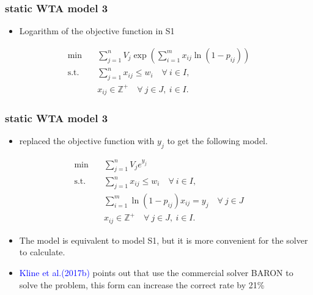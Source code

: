 \documentclass[CJK,10pt]{beamer}
\begin{document}
\begin{frame}
    \frametitle{static WTA model 3}
    \begin{itemize}
        \item Logarithm of the objective function in S1
    \end{itemize}
    \begin{align*} \tag{S3.1}
        \min\quad & \sum_{j=1}^n V_j \exp \left( \sum_{i=1}^m {x_{ij}\ln(1 -  p_{ij})} \right) \\ 
        \mathrm{s. t.}\quad &\sum_{j=1}^n x_{ij} \leq w_i\quad \forall ~i \in I,\\
        & x_{ij} \in \mathbb{Z}^+ \quad \forall~ j\in J , ~ i \in I.
    \end{align*}
\end{frame}

\begin{frame}
    \frametitle{static WTA model 3}
    \begin{itemize}
        \item replaced the objective function with $y_j$ to get the following model.
    \end{itemize}
    \begin{align*} \tag{S3.2}
        \min\quad & \sum_{j=1}^n V_j e^{y_j}  \\ 
        \mathrm{s. t.}\quad &\sum_{j=1}^n x_{ij} \leq w_i\quad \forall ~i \in I,\\
        & \sum_{i=1}^m {\ln(1 -  p_{ij}) x_{ij}} = y_j \quad \forall ~ j \in J\\
        & x_{ij} \in \mathbb{Z}^+ \quad \forall~ j\in J , ~ i \in I.
    \end{align*}
    \begin{itemize}
        \item The model is equivalent to model S1, but it is more convenient for the solver to calculate.
        \item \textcolor{blue}{Kline et al.(2017b)} points out that use the commercial solver BARON to solve the problem, this form can increase the correct rate by 21\%
    \end{itemize}
\end{frame}
\end{document}
